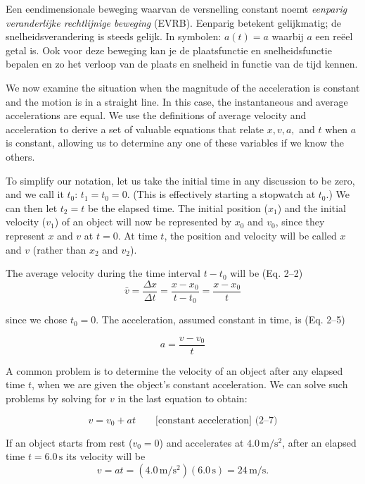 \documentclass{ximera}
\begin{document}
	\author{Bart Lambregs}
    \xmsource\xmuitleg



Een eendimensionale beweging waarvan de versnelling constant noemt  \textit{eenparig veranderlijke rechtlijnige be\-we\-ging} (EVRB). Eenparig betekent gelijkmatig; de snelheidsverandering is steeds gelijk. In symbolen: $a(t)=a$ waarbij $a$ een reëel getal is. Ook voor deze beweging kan je de plaatsfunctie en snelheidsfunctie bepalen en zo het verloop van de plaats en snelheid in functie van de tijd kennen. 



We now examine the situation when the magnitude of the acceleration is constant and the motion is in a straight line. In this case, the instantaneous and average accelerations are equal. We use the definitions of average velocity and acceleration to derive a set of valuable equations that relate \( x, v, a, \) and \( t \) when \( a \) is constant, allowing us to determine any one of these variables if we know the others.

To simplify our notation, let us take the initial time in any discussion to be zero, and we call it \( t_0 \): \( t_1 = t_0 = 0 \). (This is effectively starting a stopwatch at \( t_0 \).) We can then let \( t_2 = t \) be the elapsed time. The initial position (\( x_1 \)) and the initial velocity (\( v_1 \)) of an object will now be represented by \( x_0 \) and \( v_0 \), since they represent \( x \) and \( v \) at \( t = 0 \). At time \( t \), the position and velocity will be called \( x \) and \( v \) (rather than \( x_2 \) and \( v_2 \)).

The average velocity during the time interval \( t - t_0 \) will be (Eq. 2–2)
\[
\bar{v} = \frac{\Delta x}{\Delta t} = \frac{x - x_0}{t - t_0} = \frac{x - x_0}{t}
\]

since we chose \( t_0 = 0 \). The acceleration, assumed constant in time, is (Eq. 2–5)

\[
a = \frac{v - v_0}{t}
\]

A common problem is to determine the velocity of an object after any elapsed time \( t \), when we are given the object's constant acceleration. We can solve such problems by solving for \( v \) in the last equation to obtain:

\[
v = v_0 + at \qquad \text{[constant acceleration] (2–7)}
\]

If an object starts from rest (\( v_0 = 0 \)) and accelerates at \( 4.0\,\mathrm{m/s^2} \), after an elapsed time \( t = 6.0\,\mathrm{s} \) its velocity will be 
\[
v = at = (4.0\,\mathrm{m/s^2})(6.0\,\mathrm{s}) = 24\,\mathrm{m/s}.
\]
\end{document}
